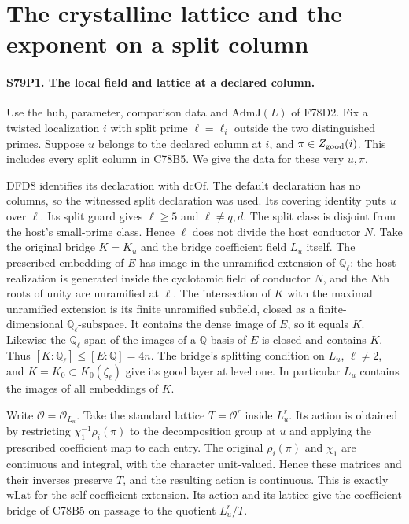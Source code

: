 \section{The crystalline lattice and the exponent on a split column}

\paragraph{S79P1. The local field and lattice at a declared column.}
Use the hub, parameter, comparison data and $\mathrm{AdmJ}(L)$
of F78D2. Fix a twisted localization $i$ with split prime
$\ell=\ell_i$ outside the two distinguished primes. Suppose $u$
belongs to the declared column at $i$, and $\pi\in Z_{\rm good}(i)$.
This includes every split column in C78B5. We give the data for
these very $u,\pi$.

DFD8 identifies its declaration with $\mathrm{dcOf}$. The default
declaration has no columns, so the witnessed split declaration was
used. Its covering identity puts $u$ over $\ell$. Its split guard
gives $\ell\ge5$ and $\ell\ne q,d$. The split class is disjoint
from the host's small-prime class. Hence $\ell$ does not divide
the host conductor $N$. Take the original bridge $K=K_u$ and
the bridge coefficient field $L_u$ itself. The prescribed embedding
of $E$ has image in the unramified extension of $\mathbb Q_\ell$:
the host realization is generated inside the cyclotomic field of
conductor $N$, and the $N$th roots of unity are unramified at $\ell$.
The intersection of $K$ with the maximal unramified extension is its
finite unramified subfield, closed as a finite-dimensional
$\mathbb Q_\ell$-subspace. It contains the dense image of $E$,
so it equals $K$. Likewise the $\mathbb Q_\ell$-span of the images
of a $\mathbb Q$-basis of $E$ is closed and contains $K$. Thus
$[K:\mathbb Q_\ell]\le[E:\mathbb Q]=4n$. The bridge's splitting
condition on $L_u$, $\ell\ne2$, and $K=K_0\subset K_0(\zeta_\ell)$
give its good layer at level one. In particular $L_u$ contains
the images of all embeddings of $K$.

Write $\mathcal O=\mathcal O_{L_u}$. Take the standard lattice
$T=\mathcal O^r$ inside $L_u^r$. Its action is obtained by
restricting $\chi_1^{-1}\rho_i(\pi)$ to the decomposition group at
$u$ and applying the prescribed coefficient map to each entry.
The original $\rho_i(\pi)$ and $\chi_1$ are continuous and
integral, with the character unit-valued. Hence these matrices and
their inverses preserve $T$, and the resulting action is
continuous. This is exactly $\mathrm{wLat}$ for the self coefficient
extension. Its action and its lattice give the coefficient bridge of
C78B5 on passage to the quotient $L_u^r/T$.

